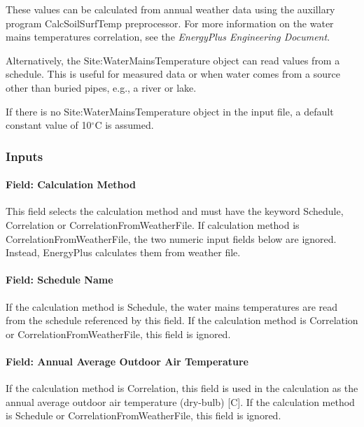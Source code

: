 These values can be calculated from annual weather data using the auxillary program CalcSoilSurfTemp preprocessor. For more information on the water mains temperatures correlation, see the \emph{EnergyPlus Engineering Document}.

Alternatively, the Site:WaterMainsTemperature object can read values from a schedule. This is useful for measured data or when water comes from a source other than buried pipes, e.g., a river or lake.

If there is no Site:WaterMainsTemperature object in the input file, a default constant value of 10$^\circ$C is assumed.

\subsubsection{Inputs}\label{inputs-21-003}

\paragraph{Field: Calculation Method}\label{field-calculation-method}

This field selects the calculation method and must have the keyword Schedule, Correlation or CorrelationFromWeatherFile. If calculation method is CorrelationFromWeatherFile, the two numeric input fields below are ignored. Instead, EnergyPlus calculates them from weather file.

\paragraph{Field: Schedule Name}\label{field-schedule-name-003}

If the calculation method is Schedule, the water mains temperatures are read from the schedule referenced by this field. If the calculation method is Correlation or CorrelationFromWeatherFile, this field is ignored.

\paragraph{Field: Annual Average Outdoor Air Temperature}\label{field-annual-average-outdoor-air-temperature}

If the calculation method is Correlation, this field is used in the calculation as the annual average outdoor air temperature (dry-bulb) {[}C{]}. If the calculation method is Schedule or CorrelationFromWeatherFile, this field is ignored.

